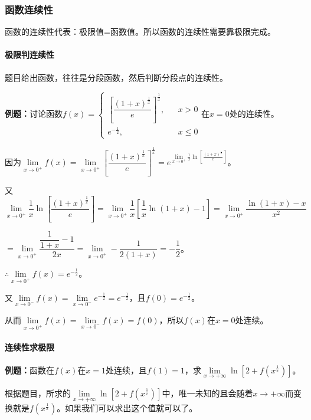 \documentclass[UTF8, 12pt]{ctexart}
\begin{document}
\subsubsection{函数连续性}

函数的连续性代表：极限值=函数值。所以函数的连续性需要靠极限完成。

\paragraph{极限判连续性} \leavevmode \medskip

题目给出函数，往往是分段函数，然后判断分段点的连续性。\medskip

\textbf{例题：}讨论函数$f(x)=\left\{\begin{array}{lcl}
    \left[\dfrac{(1+x)^{\frac{1}{x}}}{e}\right]^{\frac{1}{x}},& & x>0 \\
    e^{-\frac{1}{2}}, & & x\leqslant 0
\end{array}\right.$在$x=0$处的连续性。

因为$\lim\limits_{x\to 0^+}f(x)=\lim\limits_{x\to 0^+}\left[\dfrac{(1+x)^{\frac{1}{x}}}{e}\right]^{\frac{1}{x}}=e^{\lim\limits_{x\to 0^+}\frac{1}{x}\ln[\frac{(1+x)^{\frac{1}{x}}}{e}]}$。

又$\lim\limits_{x\to 0^+}\dfrac{1}{x}\ln\left[\dfrac{(1+x)^{\frac{1}{x}}}{e}\right]=\lim\limits_{x\to 0^+}\dfrac{1}{x}\left[\dfrac{1}{x}\ln(1+x)-1\right]=\lim\limits_{x\to 0^+}\dfrac{\ln(1+x)-x}{x^2}$

$=\lim\limits_{x\to 0^+}\dfrac{\dfrac{1}{1+x}-1}{2x}=\lim\limits_{x\to 0^+}-\dfrac{1}{2(1+x)}=-\dfrac{1}{2}$。

$\therefore\lim\limits_{x\to 0^+}f(x)=e^{-\frac{1}{2}}$。

又$\lim\limits_{x\to 0^-}f(x)=\lim\limits_{x\to 0^-}e^{-\frac{1}{2}}=e^{-\frac{1}{2}}$，且$f(0)=e^{-\frac{1}{2}}$。

从而$\lim\limits_{x\to 0^+}f(x)=\lim\limits_{x\to 0^-}f(x)=f(0)$，所以$f(x)$在$x=0$处连续。

\paragraph{连续性求极限} \leavevmode \medskip

\textbf{例题：}函数在$f(x)$在$x=1$处连续，且$f(1)=1$，求$\lim\limits_{x\to+\infty}\ln\left[2+f\left(x^{\frac{1}{x}}\right)\right]$。

根据题目，所求的$\lim\limits_{x\to+\infty}\ln\left[2+f\left(x^{\frac{1}{x}}\right)\right]$中，唯一未知的且会随着$x\to+\infty$而变换就是$f\left(x^{\frac{1}{x}}\right)$。如果我们可以求出这个值就可以了。
\end{document}

